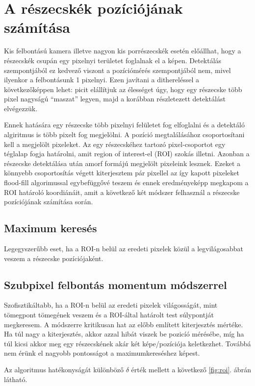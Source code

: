 \section{A részecskék pozíciójának számítása}
	Kis felbontású kamera illetve nagyon kis porrészecskék esetén előállhat, hogy a részecskék csupán egy
	pixelnyi területet foglalnak el a képen. Detektálás szempontjából ez kedvező viszont a pozíciómérés
	szempontjából nem, mivel ilyenkor a felbontásunk 1 pixelnyi. Ezen javítani a dithereléssel a
	következőképpen lehet: picit elállítjuk az élességet úgy, hogy egy részecske több pixel nagyságú
	``maszat'' legyen, majd a korábban részletezett detektálást elvégezzük.
	
	Ennek hatására egy részecske több pixelnyi felületet fog elfoglalni és a detektáló algiritmus is
	több pixelt fog megjelölni. A pozíció megtalálásához csoportosítani kell a megjelölt pixeleket.
	Az egy részecskéhez tartozó pixel-csoportot egy téglalap fogja határolni, amit region of
	interest-el (ROI) szokás illetni. Azonban a részecske detektálása után amorf formájú megjelölt
	pixeleink lesznek. Ezeket a könnyebb csoportosítás végett kiterjesztem pár pixellel az így kapott
	pixeleket flood-fill algorimussal egybefüggővé teszem és ennek eredményeképp megkapom a ROI határoló
	koordiánáit, amit a következő két módszer felhasznál a részecske pozíciójának számítása során.
	\subsection*{Maximum keresés}
	Legegyszerűbb eset, ha a ROI-n belül az eredeti pixelek közül a legvilágosabbat veszem a
	részecske pozíciójaként.
	\subsection*{Szubpixel felbontás momentum módszerrel}
	Szofisztikáltabb, ha a ROI-n belül az eredeti pixelek világosságát, mint tömegpont tömegének veszem
	és a ROI-által határolt test súlypontját megkeresem. A módszerre kritikusan hat az előbb említett
	kiterjesztés mértéke. Ha túl nagy a kiterjesztés, akkor azzal hibát viszek be pozicíó mérésébe,
	míg ha túl kicsi akkor meg egy részecskének akár két képe/pozíciója keletkezhet. Továbbá nem érünk el nagyobb pontosságot a
	maximumkereséshez képest.
	
	\noindent Az algoritmus hatékonyságát különböző $\delta$ érték mellett a következő \ref{fig:roi}. ábrán látható.
	
